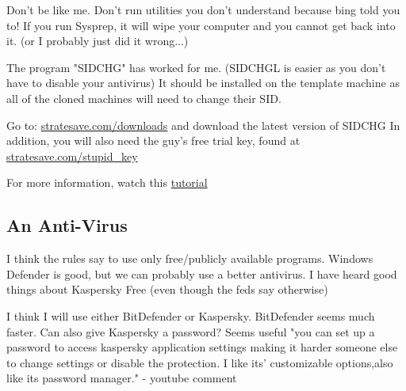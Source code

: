 \documentclass{article}
\begin{document}
Don’t be like me. Don’t run utilities you don’t understand because bing told you to!
If you run Sysprep, it will wipe your computer and you cannot get back into it. (or I probably just did it wrong...)

\noindent The program "SIDCHG" has worked for me. (SIDCHGL is easier as you don't have to disable your antivirus)
It should be installed on the template machine as all of the cloned machines will need to change their SID.

Go to: \href{https://www.stratesave.com/html/downloads.html}{stratesave.com/downloads}
and download the latest version of SIDCHG
In addition, you will also need the guy's free trial key, found at \href{https://www.stratesave.com/html/downloads.html}{stratesave.com/stupid\_key}

For more information, watch this \href{https://www.youtube.com/watch?v=4fImvgWayI0}{tutorial}

\subsection{An Anti-Virus}

I think the rules say to use only free/publicly available programs.
Windows Defender is good, but we can probably use a better antivirus.
I have heard good things about Kaspersky Free (even though the feds say otherwise)

I think I will use either BitDefender or Kaspersky. BitDefender seems much faster.
Can also give Kaspersky a password? Seems useful "you can set up a password to access kaspersky application settings making it harder someone else to change settings or disable the protection. I like its' customizable options,also like its password manager."
- youtube comment
\end{document}
